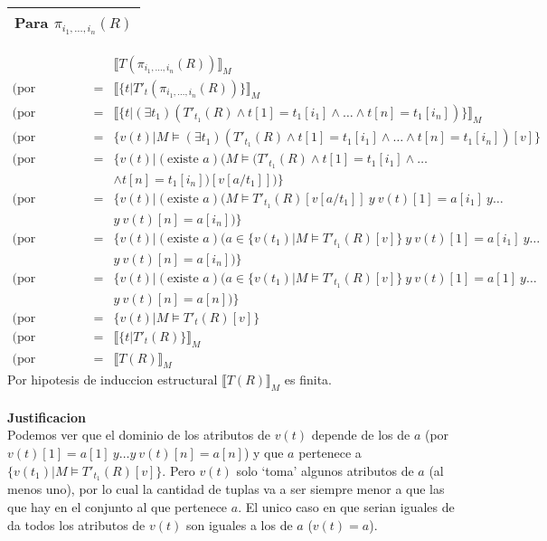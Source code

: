 \documentclass[a4paper]{article}
\newcommand{\existe}{\mbox{existe }}
\begin{document}
%
	\begin{center}
	\begin{tabular}{p{12cm}}
	\hline
	\textbf{Para $\pi_{i_1, \ldots ,i_n}(R)$} \\
	\hline
	\end{tabular}
	\end{center}
%	
		\begin{eqnarray*}
			&& \llbracket T(\pi_{i_1, \ldots ,i_n}(R))\rrbracket _M \\
			\mbox{(por traduccion)} & = & \llbracket \{t|T'_t(\pi_{i_1, \ldots ,i_n}(R))\}\rrbracket _M \\
			\mbox{(por traduccion)} & = & 
				\llbracket \{t|(\exists t_1) (T'_{t_1}(R) \wedge t[1]=t_1[i_1] \wedge\ldots\wedge t[n]=t_1[i_n])\}\rrbracket _M \\
			\mbox{(por semantica)} & = & 
				\{v(t)|M \models (\exists t_1) (T'_{t_1}(R) \wedge t[1]=t_1[i_1] \wedge\ldots\wedge t[n]=t_1[i_n])[v]\} \\
			\mbox{(por semantica)} & = & 
				\{v(t)|(\existe a) (M \models (T'_{t_1}(R) \wedge t[1]=t_1[i_1] \wedge\ldots\\
				&&\wedge t[n]=t_1[i_n])[v[a/t_1]] )\} \\
			\mbox{(por semantica)} & = & 
				\{v(t)|(\existe a) (M \models T'_{t_1}(R)[v[a/t_1]]  \ y \ v(t)[1]=a[i_1] \ y \ldots \\
				&& y \  v(t)[n]=a[i_n])\} \\
			\mbox{(por propiedad)} & = & 
				\{v(t)|(\existe a) (a \in \{v(t_1)|M \models T'_{t_1}(R)[v]\} \ y \ v(t)[1]=a[i_1] \ y \ldots \\
				&& y \  v(t)[n]=a[i_n])\} \\
			\mbox{(por justificacion)} & = & 
				\{v(t)|(\existe a) (a \in \{v(t_1)|M \models T'_{t_1}(R)[v]\} \ y \ v(t)[1]=a[1] \ y \ldots \\
				&&y \  v(t)[n]=a[n])\} \\
			\mbox{(por justificacion)} & = & \{v(t)|M \models T'_{t}(R)[v]\} \\
			\mbox{(por semantica)} & = & \llbracket \{t|T'_{t}(R)\}\rrbracket _M \\
			\mbox{(por traduccion)} & = & \llbracket T(R)\rrbracket _M
		\end{eqnarray*}
		Por hipotesis de induccion estructural $\llbracket T(R)\rrbracket _M$ es finita.\\
		\\
		\textbf{Justificacion}\\
		Podemos ver que el dominio de los atributos de $v(t)$ depende de los de $a$ (por $v(t)[1]=a[1] \ y \ldots y \  v(t)[n]=a[n]$) y que $a$ pertenece a $\{v(t_1)|M \models T'_{t_1}(R)[v]\}$. Pero $v(t)$ solo `toma' algunos atributos de $a$ (al menos uno), por lo cual la cantidad de tuplas va a ser siempre menor a que las que hay en el conjunto al que pertenece $a$. El unico caso en que serian iguales de da todos los atributos de $v(t)$ son iguales a los de $a$ ($v(t)=a$).\\
\end{document}
